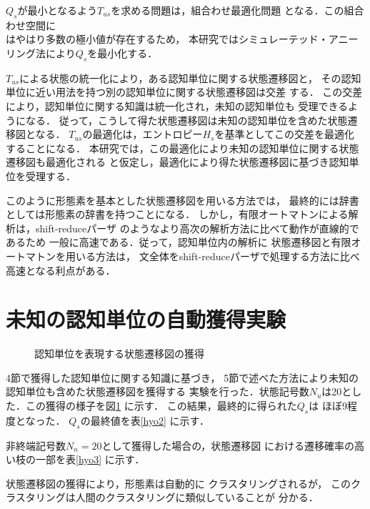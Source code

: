 $Q_s$が最小となるよう$T_{us}$を求める問題は，組合わせ最適化問題
となる．この組合わせ空間に\\はやはり多数の極小値が存在するため，
本研究ではシミュレーテッド・アニーリング法により$Q_s$を最小化する．

$T_{us}$による状態の統一化により，ある認知単位に関する状態遷移図と，
その認知単位に近い用法を持つ別の認知単位に関する状態遷移図は交差
する．
この交差により，認知単位に関する知識は統一化され，未知の認知単位も
受理できるようになる．
従って，こうして得た状態遷移図は未知の認知単位を含めた状態遷移図となる．
$T_{us}$の最適化は，エントロピー$H_s$を基準としてこの交差を最適化
することになる．
本研究では，この最適化により未知の認知単位に関する状態遷移図も最適化される
と仮定し，最適化により得た状態遷移図に基づき認知単位を受理する．

このように形態素を基本とした状態遷移図を用いる方法では，
最終的には辞書としては形態素の辞書を持つことになる．
しかし，有限オートマトンによる解析は，shift-reduceパーザ
のようなより高次の解析方法に比べて動作が直線的であるため
一般に高速である．従って，認知単位内の解析に
状態遷移図と有限オートマトンを用いる方法は，
文全体をshift-reduceパーザで処理する方法に比べ
高速となる利点がある．



\section{未知の認知単位の自動獲得実験}

\begin{figure}[b]
\begin{center}

\end{center}
\caption{認知単位を表現する状態遷移図の獲得} \label{zu6}
\end{figure}



4節で獲得した認知単位に関する知識に基づき，
5節で述べた方法により未知の認知単位も含めた状態遷移図を獲得する
実験を行った．状態記号数$N_u$は20とした．この獲得の様子を図\ref{zu6} に示す．
この結果，最終的に得られた$Q_s$は
ほぼ9程度となった．
$Q_s$の最終値を表\ref{hyo2} に示す．

非終端記号数$N_n=20$として獲得した場合の，状態遷移図
における遷移確率の高い枝の一部を表\ref{hyo3} に示す．

状態遷移図の獲得により，形態素は自動的に
クラスタリングされるが，
このクラスタリングは人間のクラスタリングに類似していることが
分かる．

